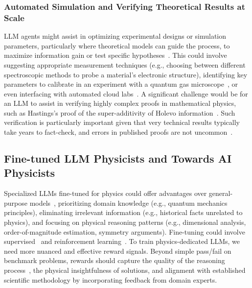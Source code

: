 \subsubsection{Automated Simulation and Verifying Theoretical Results at Scale}
\label{sec:automated_design_future}
LLM agents might assist in optimizing experimental designs or simulation parameters, particularly where theoretical models can guide the process, to maximize information gain or test specific hypotheses~\cite{Kaiser2025Large}. This could involve suggesting appropriate measurement techniques (e.g., choosing between different spectroscopic methods to probe a material's electronic structure), identifying key parameters to calibrate in an experiment with a quantum gas microscope~\cite{Gross2017Quantum}, or even interfacing with automated cloud labs~\cite{Lu2024AI}.
A significant challenge would be for an LLM to assist in verifying highly complex proofs in mathematical physics, such as Hastings's proof of the super-additivity of Holevo information~\cite{Hastings2009Superadditivity}.
Such verification is particularly important given that very technical results typically take years to fact-check, and errors in published proofs are not uncommon~\cite{Vidick2020It}.
\subsection{Fine-tuned LLM Physicists and Towards AI Physicists}
Specialized LLMs fine-tuned for physics could offer advantages over general-purpose models~\cite{Beltagy2019SciBERT}, prioritizing domain knowledge (e.g., quantum mechanics principles), eliminating irrelevant information (e.g., historical facts unrelated to physics), and focusing on physical reasoning patterns (e.g., dimensional analysis, order-of-magnitude estimation, symmetry arguments). Fine-tuning could involve supervised~\cite{Ouyang2022Training} and reinforcement learning~\cite{Trung2024ReFT}.
To train physics-dedicated LLMs, we need more nuanced and effective reward signals. Beyond simple pass/fail on benchmark problems, rewards should capture the quality of the reasoning process~\cite{Lightman2023Lets}, the physical insightfulness of solutions, and alignment with established scientific methodology by incorporating feedback from domain experts.

